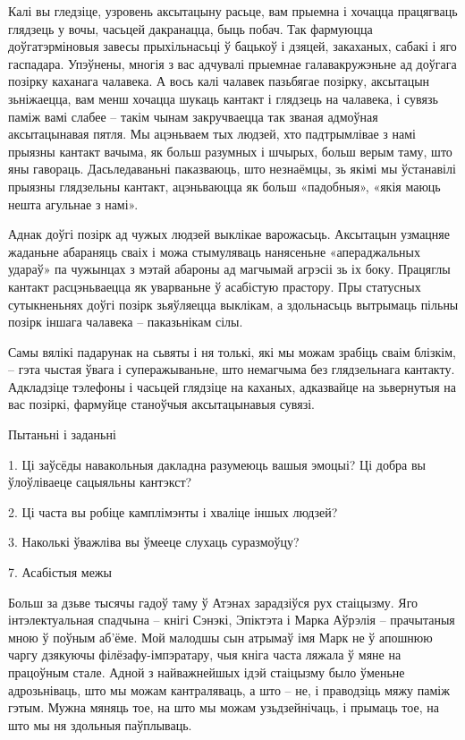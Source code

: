 Калі вы гледзіце, узровень аксытацыну расьце, вам прыемна і хочацца працягваць глядзець у вочы, часьцей дакранацца, быць побач. Так фармуюцца доўгатэрміновыя завесы прыхільнасьці ў бацькоў і дзяцей, закаханых, сабакі і яго гаспадара. Упэўнены, многія з вас адчувалі прыемнае галавакружэньне ад доўгага позірку каханага чалавека. А вось калі чалавек пазьбягае позірку, аксытацын зьніжаецца, вам менш хочацца шукаць кантакт і глядзець на чалавека, і сувязь паміж вамі слабее – такім чынам закручваецца так званая адмоўная аксытацынавая пятля. Мы ацэньваем тых людзей, хто падтрымлівае з намі прыязны кантакт вачыма, як больш разумных і шчырых, больш верым таму, што яны гавораць. Дасьледаваньні паказваюць, што незнаёмцы, зь якімі мы ўстанавілі прыязны глядзельны кантакт, ацэньваюцца як больш «падобныя», «якія маюць нешта агульнае з намі».

Аднак доўгі позірк ад чужых людзей выклікае варожасьць. Аксытацын узмацняе жаданьне абараняць сваіх і можа стымуляваць нанясеньне «апераджальных удараў» па чужынцах з мэтай абароны ад магчымай агрэсіі зь іх боку. Працяглы кантакт расцэньваецца як уварваньне ў асабістую прастору. Пры статусных сутыкненьнях доўгі позірк зьяўляецца выклікам, а здольнасьць вытрымаць пільны позірк іншага чалавека – паказьнікам сілы. 

Самы вялікі падарунак на сьвяты і ня толькі, які мы можам зрабіць сваім блізкім, – гэта чыстая ўвага і суперажываньне, што немагчыма без глядзельнага кантакту. Адкладзіце тэлефоны і часьцей глядзіце на каханых, адказвайце на зьвернутыя на вас позіркі, фармуйце станоўчыя аксытацынавыя сувязі.

Пытаньні і заданьні

1. Ці заўсёды навакольныя дакладна разумеюць вашыя эмоцыі? Ці добра вы ўлоўліваеце сацыяльны кантэкст?

2. Ці часта вы робіце камплімэнты і хваліце іншых людзей?

3. Наколькі ўважліва вы ўмееце слухаць суразмоўцу?


7. Асабістыя межы

Больш за дзьве тысячы гадоў таму ў Атэнах зарадзіўся рух стаіцызму. Яго інтэлектуальная спадчына – кнігі Сэнэкі, Эпіктэта і Марка Аўрэлія – прачытаныя мною ў поўным аб'ёме. Мой малодшы сын атрымаў імя Марк не ў апошнюю чаргу дзякуючы філёзафу-імпэратару, чыя кніга часта ляжала ў мяне на працоўным стале. Адной з найважнейшых ідэй стаіцызму было ўменьне адрозьніваць, што мы можам кантраляваць, а што – не, і праводзіць мяжу паміж гэтым. Мужна мяняць тое, на што мы можам узьдзейнічаць, і прымаць тое, на што мы ня здольныя паўплываць.

